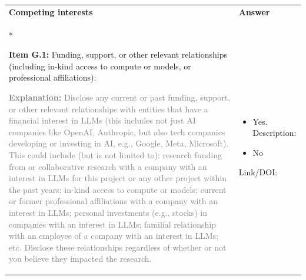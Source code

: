 \documentclass[12pt]{article}
\newcommand{\unchecked}{\ding{111}} %
\begin{document}
\begin{longtable}{|p{}|p{}|}
\hline
\rowcolor{green!20}
\textbf{{Competing interests}} & \textbf{Answer} \\*   %
\hline

\textbf{Item G.1:} Funding, support, or other relevant relationships (including in-kind access to compute or models, or professional affiliations):

\textcolor{gray}{{\footnotesize
\textbf{Explanation:} Disclose any current or past funding, support, or other relevant relationships with entities that have a financial interest in LLMs (this includes not just AI companies like OpenAI, Anthropic, but also tech companies developing or investing in AI, e.g., Google, Meta, Microsoft). This could include (but is not limited to): research funding from or collaborative research with a company with an interest in LLMs for this project or any other project within the past years; in-kind access to compute or models; current or former professional affiliations with a company with an interest in LLMs; personal investments (e.g., stocks) in companies with an interest in LLMs; familial relationship with an employee of a company with an interest in LLMs; etc. Disclose these relationships regardless of whether or not you believe they impacted the research. 
}}
& 
\begin{itemize}[leftmargin=*]\setlength{\itemsep}{0pt}\setlength{\parskip}{0pt}
    \item[\unchecked] Yes. Description:
    \item[\unchecked] No
\end{itemize} 

Link/DOI: \\
\hline
\end{longtable}
\end{document}

